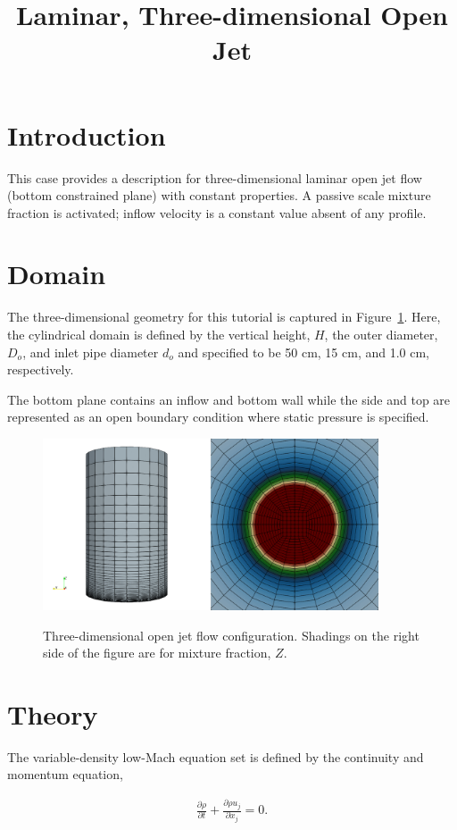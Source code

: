 \documentclass{article}
\title{Laminar, Three-dimensional Open Jet}
\date{}
\begin{document}
\maketitle

\section{Introduction}
This case provides a description for three-dimensional laminar
open jet flow (bottom constrained plane) with constant properties. A passive
scale mixture fraction is activated; inflow velocity is a constant value
absent of any profile.

\section{Domain}
The three-dimensional geometry for this tutorial is captured in 
Figure~\ref{fig:geom}. Here, the cylindrical domain is defined by the 
vertical height, $H$, the outer diameter, $D_o$, and inlet pipe diameter $d_o$ and 
specified to be 50 cm, 15 cm, and 1.0 cm, respectively. 

The bottom plane contains an inflow and bottom wall while the side and top are represented
as an open boundary condition where static pressure is specified.

\begin{figure}[!htbp]
  \centering
  {
   \includegraphics[height=2.0in]{images/3d_hex8_open_jet_geom.png}
  }
  \caption{Three-dimensional open jet flow configuration. Shadings on the
right side of the figure are for mixture fraction, $Z$.}
  \label{fig:geom}
\end{figure}

\section{Theory}
The variable-density low-Mach equation set is defined by the continuity and momentum equation,

\begin{align}
  \frac {\partial \rho }{\partial t} + \frac{ \partial \rho u_j}{\partial x_j} = 0.
\label{eq:contEq}
\end{align} 
\end{document}
